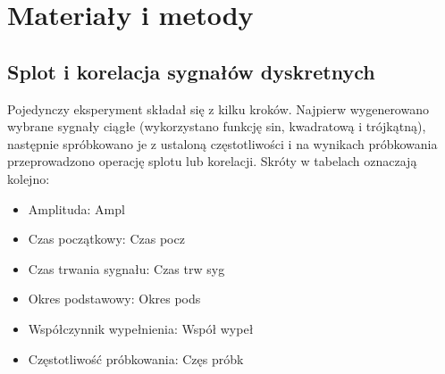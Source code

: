 \documentclass[12pt]{article}
\begin{document}
    \section{Materiały i metody} {

        \subsection{Splot i korelacja sygnałów dyskretnych} {
            Pojedynczy eksperyment składał się z kilku kroków. Najpierw wygenerowano wybrane sygnały
            ciągłe (wykorzystano funkcję sin, kwadratową i trójkątną), następnie spróbkowano je z
            ustaloną częstotliwości i na wynikach próbkowania przeprowadzono operację splotu lub
            korelacji.
            Skróty w tabelach oznaczają kolejno:
            \begin{itemize}
                \item Amplituda: Ampl
                \item Czas początkowy: Czas pocz
                \item Czas trwania sygnału: Czas trw syg
                \item Okres podstawowy: Okres pods
                \item Współczynnik wypełnienia: Współ wypeł
                \item Częstotliwość próbkowania: Częs próbk
            \end{itemize}
        }

}
\end{document}
